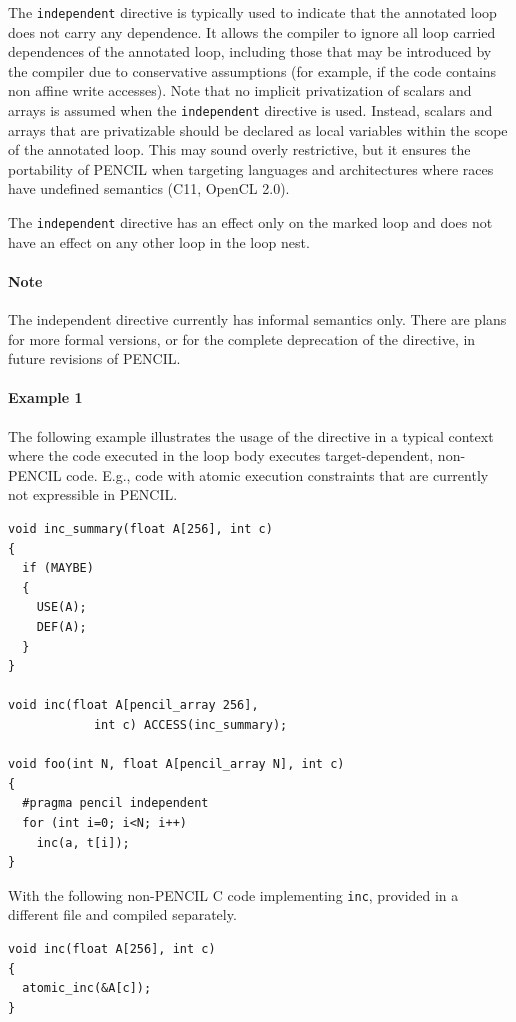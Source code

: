 The \lstinline!independent! directive is typically used to indicate
that the annotated loop does not carry any dependence.  It allows the
compiler to ignore all loop carried dependences of the annotated loop,
including those that may be introduced by the compiler due to
conservative assumptions (for example, if the code contains non affine
write accesses).
Note that no implicit privatization of scalars and arrays is assumed when
the \lstinline!independent! directive is used.  Instead, scalars and
arrays that are privatizable should be declared as local variables
within the scope of the annotated loop.
This may sound overly restrictive, but it ensures the portability of
PENCIL when targeting languages and architectures where races have
undefined semantics (C11, OpenCL 2.0).

The \lstinline!independent! directive has an effect only on the marked loop
and does not have an effect on any other loop in the loop nest.

\paragraph{Note}
The independent directive currently has informal semantics only. There
are plans for more formal versions, or for the complete deprecation of
the directive, in future revisions of PENCIL.

\paragraph{Example 1}

  The following example illustrates the usage of the directive in a
  typical context where the code executed in the loop body executes
  target-dependent, non-PENCIL code. E.g., code with atomic execution
  constraints that are currently not expressible in PENCIL.
  \begin{lstlisting}[language=pencil]
void inc_summary(float A[256], int c)
{
  if (MAYBE)
  {
    USE(A);
    DEF(A);
  }
}

void inc(float A[pencil_array 256],
            int c) ACCESS(inc_summary);

void foo(int N, float A[pencil_array N], int c)
{
  #pragma pencil independent
  for (int i=0; i<N; i++)
    inc(a, t[i]);
}  
  \end{lstlisting}

  With the following non-PENCIL C code implementing \lstinline!inc!,
  provided in a different file and compiled separately.
  \begin{lstlisting}[language=pencil]
void inc(float A[256], int c)
{
  atomic_inc(&A[c]);
}
  \end{lstlisting}


